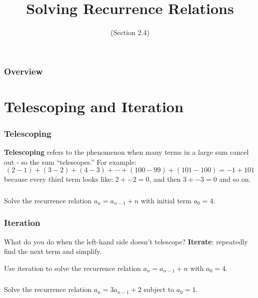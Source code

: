 \documentclass[11pt, compress]{beamer}
\title{Solving Recurrence Relations}
\subtitle{(Section 2.4)}
\author{}
\date[]{}
\newcommand{\terminology}[1]{\textbf{#1}}
\begin{document}
\begin{frame}
\maketitle 
\end{frame}
 
\begin{frame}
\frametitle{Overview}
\tableofcontents 
\end{frame}
 

\section{Telescoping and Iteration}
\begin{frame}
\frametitle{Telescoping}
 \terminology{Telescoping} refers to the phenomenon when many terms in a large sum cancel out - so the sum ``telescopes.'' For example:%
\begin{equation*}
(2 - 1) + (3 - 2) + (4 - 3) + \cdots + (100 - 99) + (101 - 100) = -1 + 101
\end{equation*}
because every third term looks like: \(2 + -2 = 0\), and then \(3 + -3 = 0\) and so on.
\end{frame}
 
\begin{frame}
\frametitle{}
\begin{example}[2.4.3]Solve the recurrence relation \(a_n = a_{n-1} + n\) with initial term \(a_0 = 4\).
\end{example}
\end{frame}
 
\begin{frame}
\frametitle{Iteration}
 What do you do when the left-hand side doesn't telescope?  \terminology{Iterate}: repeatedly find the next term and simplify.
 \begin{example}[2.4.4]Use iteration to solve the recurrence relation \(a_n = a_{n-1} + n\) with \(a_0 = 4\).
\end{example}
\end{frame}
 
\begin{frame}
\frametitle{}
\begin{example}[2.4.5]Solve the recurrence relation \(a_n = 3a_{n-1} + 2\) subject to \(a_0 = 1\).
\end{example}
\end{frame}
 
\end{document}

